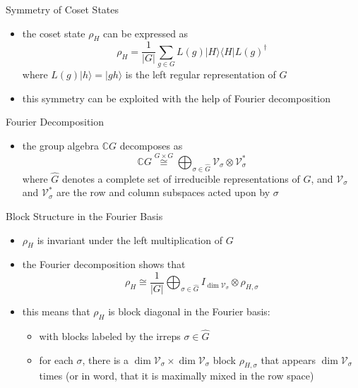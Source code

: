 \documentclass[slideColor]{prosper}
\newcommand{\C}{{\mathbb{C}}}
\newcommand{\cV}{{\mathcal{V}}}
\renewcommand{\>}{\rangle}
\newcommand{\<}{\langle}
\begin{document}

\begin{slide}{Symmetry of Coset States}
\begin{itemize}
\item the coset state $\rho_H$ can be expressed as
\[
\rho_H = \frac{1}{|G|} \sum_{g\in G} L(g) |H\>\<H| L(g)^\dagger
\]
where $L(g)|h\> = |gh\>$ is the left regular representation of $G$
\item this symmetry can be exploited with the help of Fourier decomposition
\end{itemize}
\end{slide}


\begin{slide}{Fourier Decomposition}
\begin{itemize}
\item the group algebra $\C G$ decomposes as
\[
  \C G \stackrel{G \times G}{\cong}
  \bigoplus_{\sigma \in \hat G} \cV_\sigma \otimes \cV_\sigma^*
\]
where $\hat G$ denotes a complete set of irreducible representations of $G$, and $\cV_\sigma$ and $\cV_\sigma^*$ are the row and column subspaces acted upon by $\sigma$
\end{itemize}
\end{slide}


\begin{slide}{Block Structure in the Fourier Basis}
\begin{itemize}
\item $\rho_H$ is invariant under the left multiplication of $G$
\item the Fourier decomposition shows that
\[
\rho_H \cong 
\frac{1}{|G|} 
\bigoplus_{\sigma \in \hat{G}} I_{\dim \cV_\sigma} \otimes \rho_{H,\sigma}
\]
\item this means that $\rho_H$ is block diagonal in the Fourier basis:
\begin{itemize}
\item with blocks labeled by the irreps $\sigma\in\hat G$
\item for each $\sigma$, there is a $\dim \cV_\sigma \times \dim \cV_\sigma$ block $\rho_{H,\sigma}$ that appears $\dim \cV_\sigma$ times (or in word, that it is maximally mixed in the row space)
\end{itemize}
\end{itemize}
\end{slide}
\end{document}
